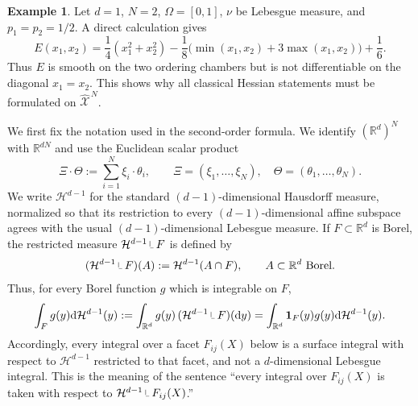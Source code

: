 \documentclass[11pt]{article}
\def\R{\mathbb{R}}
\def\Xc{{\mathcal X}}
\def\id{\mathbf{1}}
\def\hX{\widehat{\Xc}^{\,N}}
\newcommand{\dd}{\mathrm{d}}
\newcommand{\HH}{\mathcal H}
\newcommand{\restr}{\mathbin{\vrule height 1.4ex depth -0.3ex width 0.08ex\vrule height 0.08ex depth -0.02ex width 0.7ex}}
\theoremstyle{definition}
\newtheorem{example}[theorem]{Example}
\theoremstyle{remark}
\numberwithin{equation}{section}
\begin{document}
\begin{example}\label{ex:one-dimensional-collision}
Let $d=1$, $N=2$, $\Omega=[0,1]$, $\nu$ be Lebesgue measure, and
$p_1=p_2=1/2$.  A direct calculation gives
\begin{equation}\label{eq:collision-example}
 E(x_1,x_2)=\frac14(x_1^2+x_2^2)
 -\frac18\bigl(\min(x_1,x_2)+3\max(x_1,x_2)\bigr)+\frac16.
\end{equation}
Thus $E$ is smooth on the two ordering chambers but is not differentiable on the diagonal
$x_1=x_2$.  This shows why all classical Hessian statements must be formulated on $\hX$.
\end{example}


We first fix the notation used in the second-order formula.  We identify
$(\R^d)^N$ with $\R^{dN}$ and use the Euclidean scalar product
\[
 \Xi\cdot\Theta:=\sum_{i=1}^N\xi_i\cdot\theta_i,
 \qquad
 \Xi=(\xi_1,\ldots,\xi_N),\quad
 \Theta=(\theta_1,\ldots,\theta_N).
\]
We write $\HH^{d-1}$ for the standard $(d-1)$-dimensional Hausdorff measure,
normalized so that its restriction to every $(d-1)$-dimensional affine subspace agrees with the
usual $(d-1)$-dimensional Lebesgue measure.  If $F\subset\R^d$ is Borel, the restricted measure
$\HH^{d-1}\restr F$ is defined by
\begin{equation}\label{eq:restricted-Hausdorff-main}
 (\HH^{d-1}\restr F)(A):=\HH^{d-1}(A\cap F),
 \qquad A\subset\R^d\text{ Borel}.
\end{equation}
Thus, for every Borel function $g$ which is integrable on $F$,
\[
 \int_F g(y)\dd\HH^{d-1}(y)
 :=\int_{\R^d}g(y)\,(\HH^{d-1}\restr F)(\dd y)
 =\int_{\R^d}\id_F(y)g(y)\dd\HH^{d-1}(y).
\]
Accordingly, every integral over a facet $F_{ij}(X)$ below is a surface integral with respect to
$\HH^{d-1}$ restricted to that facet, and not a $d$-dimensional Lebesgue integral.  This is the
meaning of the sentence ``every integral over $F_{ij}(X)$ is taken with respect to
$\HH^{d-1}\restr F_{ij}(X)$.''
\end{document}
